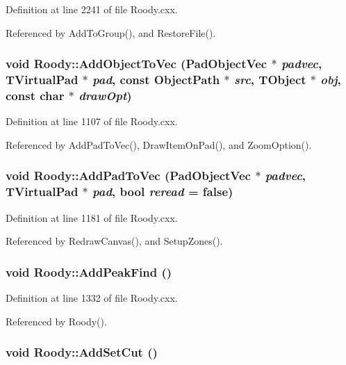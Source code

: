 Definition at line 2241 of file Roody.cxx.

Referenced by AddToGroup(), and RestoreFile().
\subsubsection[{AddObjectToVec}]{\setlength{\rightskip}{0pt plus 5cm}void Roody::AddObjectToVec ({\bf PadObjectVec} $\ast$ {\em padvec}, \/  TVirtualPad $\ast$ {\em pad}, \/  const ObjectPath $\ast$ {\em src}, \/  TObject $\ast$ {\em obj}, \/  const char $\ast$ {\em drawOpt})}\label{classRoody_a723d5bd04d150be32d5fec888234dae3}


Definition at line 1107 of file Roody.cxx.

Referenced by AddPadToVec(), DrawItemOnPad(), and ZoomOption().
\subsubsection[{AddPadToVec}]{\setlength{\rightskip}{0pt plus 5cm}void Roody::AddPadToVec ({\bf PadObjectVec} $\ast$ {\em padvec}, \/  TVirtualPad $\ast$ {\em pad}, \/  bool {\em reread} = {\ttfamily false})}\label{classRoody_a74dc53fce1c1a42d024b3a96321baaad}


Definition at line 1181 of file Roody.cxx.

Referenced by RedrawCanvas(), and SetupZones().
\subsubsection[{AddPeakFind}]{\setlength{\rightskip}{0pt plus 5cm}void Roody::AddPeakFind ()\hspace{0.3cm}{\ttfamily  [private]}}\label{classRoody_a679469f7ed5d3209518a73d375615ed6}


Definition at line 1332 of file Roody.cxx.

Referenced by Roody().
\subsubsection[{AddSetCut}]{\setlength{\rightskip}{0pt plus 5cm}void Roody::AddSetCut ()\hspace{0.3cm}{\ttfamily  [private]}}\label{classRoody_af4abbad068f9a6e6779bd9147c9cf4d6}


